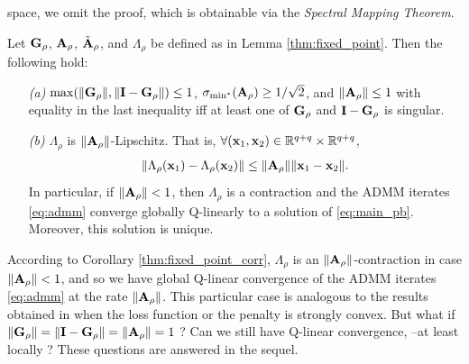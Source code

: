 space, we omit the proof, which is obtainable via the \textit{Spectral
  Mapping Theorem}.
\begin{corollary}
  Let $\mathbf{G}_{\rho}$, $\mathbf{A}_{\rho}$, $\tilde{\mathbf{A}}_{\rho}$, and $\Lambda_\rho$ be
  defined as in Lemma \ref{thm:fixed_point}. 
  Then the following hold:
  \begin{itemize}
    \item[\textit{(a)}] $\max(\|\mathbf{G}_\rho\|,
      \|\mathbf{I}-\mathbf{G}_{\rho}\|) \le 1$,
      $\sigma_{\min^*}(\mathbf{A}_\rho) \ge 1/\sqrt{2}$, and $\|\mathbf{A}_{\rho}\| \le 1$
      with equality in the last inequality iff at least one of $\mathbf{G}_\rho$
      and $\mathbf{I}-\mathbf{G}_\rho$ is singular.
\item[\textit{(b)}] $\Lambda_\rho$ is $\|\mathbf{A}_\rho\|$-Lipschitz. That is,
  $\forall (\mathbf{x}_1, \mathbf{x}_2) \in \mathbb{R}^{q+q} \times \mathbb{R}^{q+q}$,
\begin{eqnarray}
  \|\Lambda_{\rho}(\mathbf{x}_1) - \Lambda_\rho(\mathbf{x}_2)\| \le
  \|\mathbf{A}_\rho\|\|\mathbf{x}_1 - \mathbf{x}_2\|.
  \label{eq:tight}
\end{eqnarray}
 In particular, if $\|\mathbf{A}_\rho\| < 1$,
  then $\Lambda_\rho$ is a contraction and the ADMM
  iterates \eqref{eq:admm} converge globally Q-linearly to a
  solution of \eqref{eq:main_pb}. Moreover, this solution is unique.
  \end{itemize}
\label{thm:fixed_point_corr}
\end{corollary}

According to Corollary \ref{thm:fixed_point_corr}, $\Lambda_\rho$ is an
$\|\mathbf{A}_\rho\|$-contraction in case $\|\mathbf{A}_\rho\| < 1$, and so we have
global Q-linear convergence of the ADMM iterates \eqref{eq:admm} at the
rate $\|\mathbf{A}_\rho\|$. This particular case is analogous to the results
obtained in \citep{nishihara2015general} when the loss function or the
penalty is strongly convex.
But what if $\|\mathbf{G}_\rho\| = \|\mathbf{I}-\mathbf{G}_\rho\| =
\|\mathbf{A}_\rho\| = 1$ ? Can we still have Q-linear convergence, --at
least locally ? These questions are answered in the sequel.

